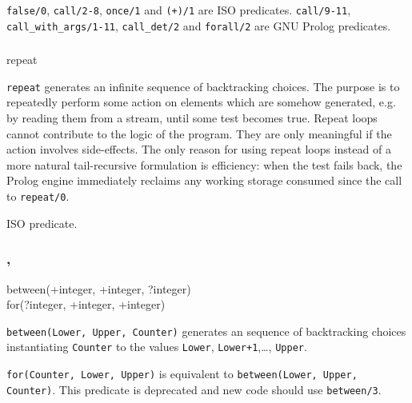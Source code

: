 \Portability

\texttt{false/0}, \texttt{call/2-8}, \texttt{once/1} and \texttt{({\bs}+)/1}
are ISO predicates. \texttt{call/9-11}, \texttt{call\_with\_args/1-11},
\texttt{call\_det/2} and \texttt{forall/2} are GNU Prolog predicates.

\subsubsection{}

\begin{TemplatesOneCol}
repeat

\end{TemplatesOneCol}

\Description

\texttt{repeat} generates an infinite sequence of backtracking choices. The
purpose is to repeatedly perform some action on elements which are somehow
generated, e.g. by reading them from a stream, until some test becomes true.
Repeat loops cannot contribute to the logic of the program. They are only
meaningful if the action involves side-effects. The only reason for using
repeat loops instead of a more natural tail-recursive formulation is
efficiency: when the test fails back, the Prolog engine immediately reclaims
any working storage consumed since the call to \texttt{repeat/0}.

\PlErrorsNone

\Portability

ISO predicate.

\subsubsection{, }

\begin{TemplatesOneCol}
between(+integer, +integer, ?integer) \\
for(?integer, +integer, +integer)

\end{TemplatesOneCol}

\Description

\texttt{between(Lower, Upper, Counter)} generates an sequence of backtracking
choices instantiating \texttt{Counter} to the values \texttt{Lower},
\texttt{Lower+1},\ldots, \texttt{Upper}.  

\texttt{for(Counter, Lower, Upper)} is equivalent to
\texttt{between(Lower, Upper, Counter)}. This predicate is deprecated and new
code should use \texttt{between/3}.

